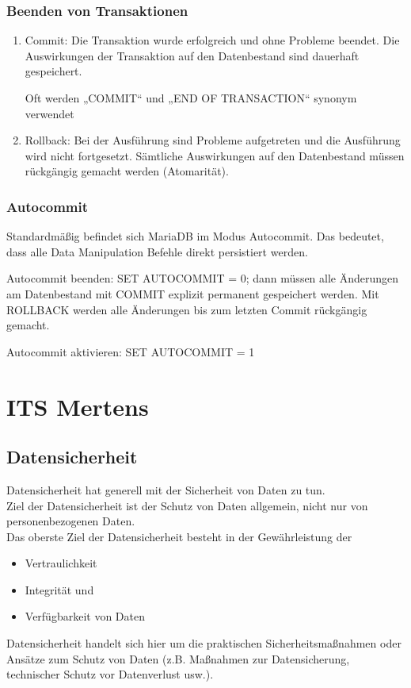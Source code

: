 \documentclass[10pt]{article}
\begin{document}
\subsubsection{Beenden von Transaktionen}

\begin{enumerate}
    \item Commit: Die Transaktion wurde erfolgreich und ohne Probleme beendet. Die Auswirkungen der Transaktion auf den Datenbestand sind dauerhaft gespeichert.
    
    Oft werden „COMMIT“ und „END OF TRANSACTION“ synonym verwendet
    \item Rollback: Bei der Ausführung sind Probleme aufgetreten und die Ausführung wird nicht fortgesetzt. Sämtliche Auswirkungen auf den Datenbestand müssen rückgängig gemacht werden (Atomarität).
\end{enumerate}

\subsubsection{Autocommit}

Standardmäßig befindet sich MariaDB im Modus Autocommit. Das bedeutet, dass alle Data Manipulation Befehle direkt persistiert werden.

Autocommit beenden: SET AUTOCOMMIT = 0; dann müssen alle Änderungen am Datenbestand mit COMMIT explizit permanent gespeichert werden.
Mit ROLLBACK werden alle Änderungen bis zum letzten Commit rückgängig gemacht.

Autocommit aktivieren: SET AUTOCOMMIT = 1

\pagebreak
\section{ITS Mertens}

\subsection{Datensicherheit}

Datensicherheit hat generell mit der Sicherheit von Daten zu tun. \\
Ziel der Datensicherheit ist der Schutz von Daten allgemein, nicht nur von personenbezogenen Daten. \\
Das oberste Ziel der Datensicherheit besteht in der Gewährleistung der

\begin{itemize}

\item Vertraulichkeit
\item Integrität und
\item Verfügbarkeit von Daten

\end{itemize}
Datensicherheit handelt sich hier um die praktischen Sicherheitsmaßnahmen oder Ansätze zum Schutz von Daten (z.B. Maßnahmen zur Datensicherung, technischer Schutz vor Datenverlust usw.).
\end{document}

